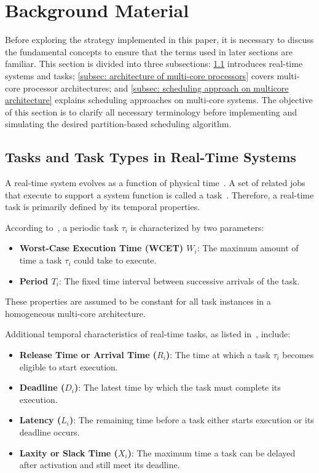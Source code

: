 \documentclass[conference]{IEEEtran}
\begin{document}
\section{Background Material}
\label{sec:fundamentals}
Before exploring the strategy implemented in this paper, it is necessary to discuss the fundamental concepts to ensure that the terms used in later sections are familiar. This section is divided into three subsections: \ref{subsec:task and task types} introduces real-time systems and tasks; \ref{subsec: architecture of multi-core processors} covers multi-core processor architectures; and \ref{subsec: scheduling approach on multicore architecture} explains scheduling approaches on multi-core systems. The objective of this section is to clarify all necessary terminology before implementing and simulating the desired partition-based scheduling algorithm.

\subsection{Tasks and Task Types in Real-Time Systems}
\label{subsec:task and task types}
A real-time system evolves as a function of physical time~\cite{kopetzDist}. A set of related jobs that execute to support a system function is called a task~\cite{9999}. Therefore, a real-time task is primarily defined by its temporal properties.

According to~\cite{5465974}, a periodic task $\tau_i$ is characterized by two parameters:
\begin{itemize}
    \item \textbf{Worst-Case Execution Time (WCET) $W_i$}: The maximum amount of time a task $\tau_i$ could take to execute.
    \item \textbf{Period $T_i$}: The fixed time interval between successive arrivals of the task.
\end{itemize}
These properties are assumed to be constant for all task instances in a homogeneous multi-core architecture.

Additional temporal characteristics of real-time tasks, as listed in~\cite{AbdallahGB24}, include:
\begin{itemize}
    \item \textbf{Release Time or Arrival Time ($R_i$)}: The time at which a task $\tau_i$ becomes eligible to start execution.
    \item \textbf{Deadline ($D_i$)}: The latest time by which the task must complete its execution.
    \item \textbf{Latency ($L_i$)}: The remaining time before a task either starts execution or its deadline occurs.
    \item \textbf{Laxity or Slack Time ($X_i$)}: The maximum time a task can be delayed after activation and still meet its deadline.
\end{itemize}
\end{document}
